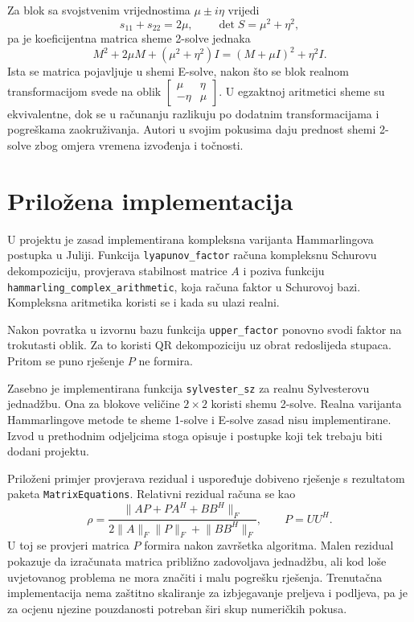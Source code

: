 \documentclass[12pt,a4paper]{article}
\begin{document}
Za blok sa svojstvenim vrijednostima $\mu \pm i\eta$ vrijedi
\[
s_{11}+s_{22} = 2\mu, \qquad \det S = \mu^2+\eta^2,
\]
pa je koeficijentna matrica sheme 2-solve jednaka
\[
M^2 + 2\mu M + (\mu^2+\eta^2)I = (M+\mu I)^2 + \eta^2I.
\]
Ista se matrica pojavljuje u shemi E-solve, nakon što se blok realnom transformacijom svede na oblik $\left[\begin{smallmatrix}\mu & \eta \\ -\eta & \mu\end{smallmatrix}\right]$. U egzaktnoj aritmetici sheme su ekvivalentne, dok se u računanju razlikuju po dodatnim transformacijama i pogreškama zaokruživanja. Autori u svojim pokusima daju prednost shemi 2-solve zbog omjera vremena izvođenja i točnosti.

\section{Priložena implementacija}

U projektu je zasad implementirana kompleksna varijanta Hammarlingova postupka u Juliji. Funkcija \texttt{lyapunov\_factor} računa kompleksnu Schurovu dekompoziciju, provjerava stabilnost matrice $A$ i poziva funkciju \texttt{hammarling\_complex\_arithmetic}, koja računa faktor u Schurovoj bazi. Kompleksna aritmetika koristi se i kada su ulazi realni.

Nakon povratka u izvornu bazu funkcija \texttt{upper\_factor} ponovno svodi faktor na trokutasti oblik. Za to koristi QR dekompoziciju uz obrat redoslijeda stupaca. Pritom se puno rješenje $P$ ne formira.

Zasebno je implementirana funkcija \texttt{sylvester\_sz} za realnu Sylvesterovu jednadžbu. Ona za blokove veličine $2\times 2$ koristi shemu 2-solve. Realna varijanta Hammarlingove metode te sheme 1-solve i E-solve zasad nisu implementirane. Izvod u prethodnim odjeljcima stoga opisuje i postupke koji tek trebaju biti dodani projektu.

Priloženi primjer provjerava rezidual i uspoređuje dobiveno rješenje s rezultatom paketa \texttt{MatrixEquations}. Relativni rezidual računa se kao
\[
\rho = \frac{\lVert AP+PA^{H}+BB^{H}\rVert_F}
{2\lVert A\rVert_F\lVert P\rVert_F+\lVert BB^{H}\rVert_F},
\qquad P = UU^{H}.
\]
U toj se provjeri matrica $P$ formira nakon završetka algoritma. Malen rezidual pokazuje da izračunata matrica približno zadovoljava jednadžbu, ali kod loše uvjetovanog problema ne mora značiti i malu pogrešku rješenja. Trenutačna implementacija nema zaštitno skaliranje za izbjegavanje preljeva i podljeva, pa je za ocjenu njezine pouzdanosti potreban širi skup numeričkih pokusa.
\end{document}
